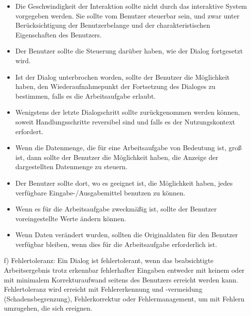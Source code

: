 \begin{itemize}
	\item Die Geschwindigkeit der Interaktion sollte nicht durch das interaktive System vorgegeben werden. Sie
	sollte vom Benutzer steuerbar sein, und zwar unter Berücksichtigung der Benutzerbelange und der
	charakteristischen Eigenschaften des Benutzers.
	\item Der Benutzer sollte die Steuerung darüber haben, wie der Dialog fortgesetzt wird.
	\item Ist der Dialog unterbrochen worden, sollte der Benutzer die Möglichkeit haben, den
	Wiederaufnahmepunkt der Fortsetzung des Dialoges zu bestimmen, falls es die Arbeitsaufgabe erlaubt.
	\item Wenigstens der letzte Dialogschritt sollte zurückgenommen werden können, soweit Handlungsschritte
	reversibel sind und falls es der Nutzungskontext erfordert.
	\item Wenn die Datenmenge, die für eine Arbeitsaufgabe von Bedeutung ist, groß ist, dann sollte der
	Benutzer die Möglichkeit haben, die Anzeige der dargestellten Datenmenge zu steuern.
	\item Der Benutzer sollte dort, wo es geeignet ist, die Möglichkeit haben, jedes verfügbare 	Eingabe-/Ausgabemittel benutzen zu können.
	\item Wenn es für die Arbeitsaufgabe zweckmäßig ist, sollte der Benutzer voreingestellte Werte ändern
	können.
	\item Wenn Daten verändert wurden, sollten die Originaldaten für den Benutzer verfügbar bleiben, wenn
	dies für die Arbeitsaufgabe erforderlich ist.
\end{itemize}
f) Fehlertoleranz:\newline
Ein Dialog ist fehlertolerant, wenn das beabsichtigte Arbeitsergebnis trotz erkennbar fehlerhafter Eingaben
entweder mit keinem oder mit minimalem Korrekturaufwand seitens des Benutzers erreicht werden kann.
Fehlertoleranz wird erreicht mit Fehlererkennung und -vermeidung (Schadensbegrenzung), Fehlerkorrektur oder Fehlermanagement, um mit Fehlern umzugehen, die sich ereignen.
